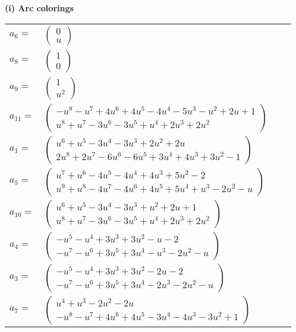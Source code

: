 \documentclass[1p]{elsarticle_modified}
\theoremstyle{definition}
\begin{document}
\flushleft \textbf{(i) Arc colorings}\\
\begin{tabular}{m{7pt} m{180pt} m{7pt} m{180pt} }
\flushright $a_{6}=$&$\begin{pmatrix}0\\u\end{pmatrix}$ \\
\flushright $a_{8}=$&$\begin{pmatrix}1\\0\end{pmatrix}$ \\
\flushright $a_{9}=$&$\begin{pmatrix}1\\u^2\end{pmatrix}$ \\
\flushright $a_{11}=$&$\begin{pmatrix}- u^8- u^7+4 u^6+4 u^5-4 u^4-5 u^3- u^2+2 u+1\\u^8+u^7-3 u^6-3 u^5+u^4+2 u^3+2 u^2\end{pmatrix}$ \\
\flushright $a_{1}=$&$\begin{pmatrix}u^6+u^5-3 u^4-3 u^3+2 u^2+2 u\\2 u^8+2 u^7-6 u^6-6 u^5+3 u^4+4 u^3+3 u^2-1\end{pmatrix}$ \\
\flushright $a_{5}=$&$\begin{pmatrix}u^7+u^6-4 u^5-4 u^4+4 u^3+5 u^2-2\\u^9+u^8-4 u^7-4 u^6+4 u^5+5 u^4+u^3-2 u^2- u\end{pmatrix}$ \\
\flushright $a_{10}=$&$\begin{pmatrix}u^6+u^5-3 u^4-3 u^3+u^2+2 u+1\\u^8+u^7-3 u^6-3 u^5+u^4+2 u^3+2 u^2\end{pmatrix}$ \\
\flushright $a_{4}=$&$\begin{pmatrix}- u^5- u^4+3 u^3+3 u^2- u-2\\- u^7- u^6+3 u^5+3 u^4- u^3-2 u^2- u\end{pmatrix}$ \\
\flushright $a_{3}=$&$\begin{pmatrix}- u^5- u^4+3 u^3+3 u^2-2 u-2\\- u^7- u^6+3 u^5+3 u^4-2 u^3-2 u^2- u\end{pmatrix}$ \\
\flushright $a_{7}=$&$\begin{pmatrix}u^4+u^3-2 u^2-2 u\\- u^8- u^7+4 u^6+4 u^5-3 u^4-4 u^3-3 u^2+1\end{pmatrix}$ \\

\end{tabular}
\end{document}
